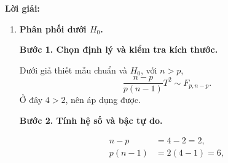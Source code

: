 \documentclass[11pt,a4paper]{article}
\newenvironment{solution}{%
  \par\medskip\noindent\textbf{Lời giải:}\par\nobreak\smallskip\noindent\ignorespaces
}{\par}
\newcommand{\answer}[1]{\boxed{#1}}
\newcommand{\step}[2]{\par\medskip\noindent\textbf{Bước #1. #2}\par\nopagebreak[4]\smallskip\noindent}
\begin{document}
\begin{solution}
\begin{enumerate}[label=\textbf{\alph*)}]
\[=\frac1{ac-b^2}\begin{pmatrix}c&-b\\-b&a\end{pmatrix}.
\]
Ở đây $a=8$, $b=-10/3$, $c=2$, nên
\begin{align*}
\det\mathbf{S}&=8\cdot2-(-10/3)^2
=16-\frac{100}{9}=\frac{44}{9}>0,\\
\mathbf{S}^{-1}&=\frac9{44}\begin{pmatrix}2&10/3\\10/3&8\end{pmatrix}.
\end{align*}
Các phần tử lần lượt là $18/44=9/22$, $30/44=15/22$,
$30/44=15/22$, $72/44=36/22$, do đó
\[
\mathbf{S}^{-1}=\frac1{22}\begin{pmatrix}9&15\\15&36\end{pmatrix}.
\]
\step{5}{Tính dạng toàn phương qua hai phép nhân.}
Trước hết
\[
\mathbf{d}=\begin{pmatrix}6-7\\10-11\end{pmatrix}
=\begin{pmatrix}-1\\-1\end{pmatrix}.
\]
Tiếp theo
\begin{align*}
\mathbf{S}^{-1}\mathbf{d}
&=\frac1{22}\begin{pmatrix}9(-1)+15(-1)\\15(-1)+36(-1)\end{pmatrix}
=\frac1{22}\begin{pmatrix}-24\\-51\end{pmatrix},\\
\mathbf{d}'(\mathbf{S}^{-1}\mathbf{d})
&=\frac{(-1)(-24)+(-1)(-51)}{22}
=\frac{24+51}{22}=\frac{75}{22},\\
T^2&=4\cdot\frac{75}{22}=\frac{300}{22}.
\end{align*}
\textbf{Kết quả:} $\displaystyle\answer{T^2=\frac{150}{11}\approx13.6364}$.
\item \textbf{Phân phối dưới $H_0$.}\par\nopagebreak[4]
\step{1}{Chọn định lý và kiểm tra kích thước.}
Dưới giả thiết mẫu chuẩn và $H_0$, với $n>p$,
\[
\frac{n-p}{p(n-1)}T^2\sim F_{p,n-p}.
\]
Ở đây $4>2$, nên áp dụng được.
\step{2}{Tính hệ số và bậc tự do.}
\begin{align*}
n-p&=4-2=2,\\
p(n-1)&=2(4-1)=6,\\

\end{align*}
\end{enumerate}
\end{solution}
\end{document}

